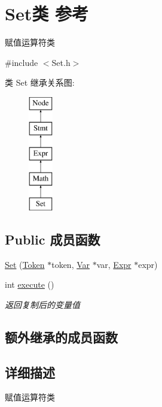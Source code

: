 \hypertarget{class_set}{}\section{Set类 参考}
\label{class_set}


赋值运算符类  




{\ttfamily \#include $<$Set.\+h$>$}

类 Set 继承关系图\+:\begin{figure}[H]
\begin{center}
\leavevmode
\includegraphics[height=5.000000cm]{class_set}
\end{center}
\end{figure}
\subsection*{Public 成员函数}
\begin{DoxyCompactItemize}
\item 
\hyperlink{class_set_a05474c6de277894bcebe5230c587efab}{Set} (\hyperlink{class_token}{Token} $\ast$token, \hyperlink{class_var}{Var} $\ast$var, \hyperlink{class_expr}{Expr} $\ast$expr)
\item 
\mbox{\label{class_set_a7776ba36f3af8b09772b36927beb5f5c}} 
int \hyperlink{class_set_a7776ba36f3af8b09772b36927beb5f5c}{execute} ()
\begin{DoxyCompactList}\small\item\em 返回复制后的变量值 \end{DoxyCompactList}\end{DoxyCompactItemize}
\subsection*{额外继承的成员函数}


\subsection{详细描述}
赋值运算符类 

